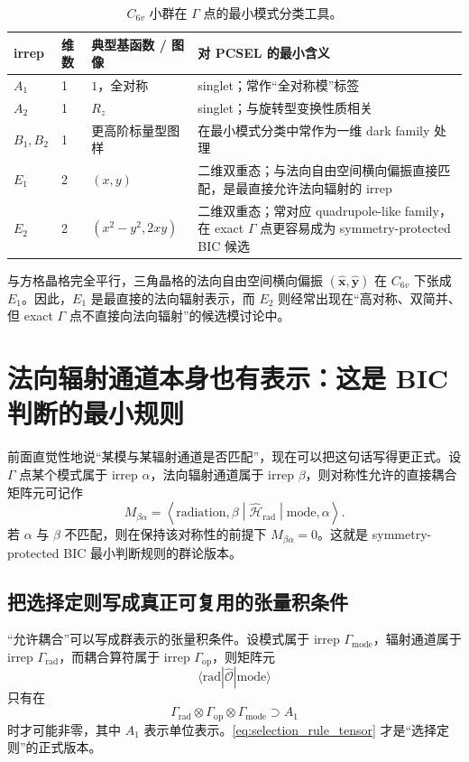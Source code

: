 \begin{table}[htbp]
  \centering
  \footnotesize
  \caption{$C_{6v}$ 小群在 $\Gamma$ 点的最小模式分类工具。}
  \label{tab:c6v-irrep}
  \setlength{\tabcolsep}{4pt}
  \begin{tabularx}{\textwidth}{@{}p{1.2cm}p{1.0cm}p{2.8cm}Y@{}}
    \toprule
    irrep & 维数 & 典型基函数 / 图像 & 对 PCSEL 的最小含义 \\
    \midrule
    $A_1$ & 1 & $1$，全对称 & singlet；常作“全对称模”标签 \\
    $A_2$ & 1 & $R_z$ & singlet；与旋转型变换性质相关 \\
    $B_1,B_2$ & 1 & 更高阶标量型图样 & 在最小模式分类中常作为一维 dark family 处理 \\
    $E_1$ & 2 & $(x,y)$ & 二维双重态；与法向自由空间横向偏振直接匹配，是最直接允许法向辐射的 irrep \\
    $E_2$ & 2 & $(x^2-y^2,2xy)$ & 二维双重态；常对应 quadrupole-like family，在 exact $\Gamma$ 点更容易成为 symmetry-protected BIC 候选 \\
    \bottomrule
  \end{tabularx}
\end{table}

与方格晶格完全平行，三角晶格的法向自由空间横向偏振 $(\hat{\bm x},\hat{\bm y})$ 在 $C_{6v}$ 下张成 $E_1$。因此，$E_1$ 是最直接的法向辐射表示，而 $E_2$ 则经常出现在“高对称、双简并、但 exact $\Gamma$ 点不直接向法向辐射”的候选模讨论中。

\section{法向辐射通道本身也有表示：这是 BIC 判断的最小规则}
前面直觉性地说“某模与某辐射通道是否匹配”，现在可以把这句话写得更正式。设 $\Gamma$ 点某个模式属于 irrep $\alpha$，法向辐射通道属于 irrep $\beta$，则对称性允许的直接耦合矩阵元可记作
\begin{equation}
M_{\beta\alpha}
=
\left\langle \text{radiation},\beta \middle| \hat{\mathcal H}_{\mathrm{rad}} \middle| \text{mode},\alpha \right\rangle.
\label{eq:irrep_coupling}
\end{equation}
若 $\alpha$ 与 $\beta$ 不匹配，则在保持该对称性的前提下 $M_{\beta\alpha}=0$。这就是 symmetry-protected BIC 最小判断规则的群论版本。

\subsection{把选择定则写成真正可复用的张量积条件}
“允许耦合”可以写成群表示的张量积条件。设模式属于 irrep $\Gamma_{\mathrm{mode}}$，辐射通道属于 irrep $\Gamma_{\mathrm{rad}}$，而耦合算符属于 irrep $\Gamma_{\mathrm{op}}$，则矩阵元
\[
\langle \mathrm{rad}|\hat{\mathcal O}|\mathrm{mode}\rangle
\]
只有在
\begin{equation}
\Gamma_{\mathrm{rad}}\otimes \Gamma_{\mathrm{op}}\otimes \Gamma_{\mathrm{mode}}
\supset
A_1
\label{eq:selection_rule_tensor}
\end{equation}
时才可能非零，其中 $A_1$ 表示单位表示。\cref{eq:selection_rule_tensor} 才是“选择定则”的正式版本。


